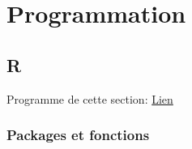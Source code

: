 \documentclass[
  12pt,
  letterpaper,
  DIV=11,
  numbers=noendperiod,
  onepage,
  openany]{scrreprt}
\begin{document}
\part{Programmation}

\hypertarget{r-6}{%
\chapter{\texorpdfstring{\textbf{R}}{R}}\label{r-6}}

Programme de cette section: \href{programme_R.R}{Lien}

\hypertarget{packages-et-fonctions}{%
\section{Packages et fonctions}\label{packages-et-fonctions}}
\end{document}
